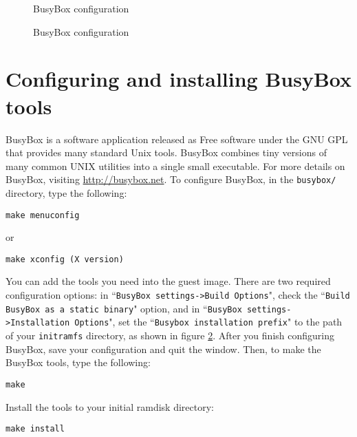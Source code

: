 \documentclass{article}[11pt]
\def\colfigsize{\epsfxsize=5in}
\begin{document}
\pagebreak
\begin{figure}[ht]
  \begin{center}
    \colfigsize{}
    \caption{BusyBox configuration}
    \label{fig:busyboxcf1}
  \end{center}
\end{figure}

\begin{figure}[h]
  \begin{center}
    \colfigsize{}
  \end{center}
  \caption{BusyBox configuration}
  \label{fig:busyboxcf2}
\end{figure}

\section{Configuring and installing BusyBox tools}

BusyBox is a software application released as Free software under the GNU GPL
that provides many standard Unix tools. BusyBox combines tiny versions of many
common UNIX utilities into a single small executable. For more details on
BusyBox, visiting \url{http://busybox.net}. To configure BusyBox, in the
\verb+busybox/+ directory, type the following:

\begin{verbatim}
make menuconfig
\end{verbatim}

or

\begin{verbatim}
make xconfig (X version)
\end{verbatim}

\vspace{10pt}
\noindent
You can add the tools you need into the guest image. There are two required
configuration options: in ``\verb|BusyBox settings->Build Options|", check the 
``\verb|Build BusyBox as a static binary|" option, and in
``\verb|BusyBox settings->Installation Options|", set the
``\verb|Busybox installation prefix|" to the path of your \verb|initramfs|
directory, as shown in figure \ref{fig:busyboxcf2}. After you finish configuring
BusyBox, save your configuration and quit the window. Then, to make the BusyBox
tools, type the following:

\begin{verbatim}
make
\end{verbatim}
Install the tools to your initial ramdisk directory:
\begin{verbatim}
make install
\end{verbatim}
\end{document}
